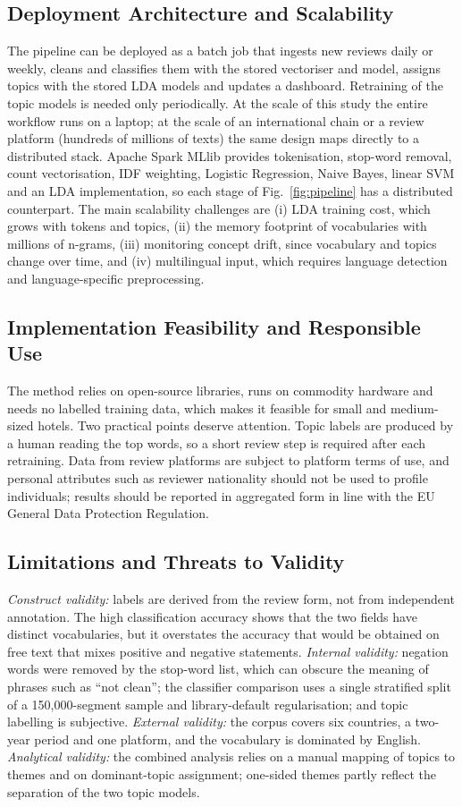 \documentclass[11pt,journal,draftclsnofoot,onecolumn]{IEEEtran}
\begin{document}
\subsection{Deployment Architecture and Scalability}
The pipeline can be deployed as a batch job that ingests new reviews daily or weekly, cleans and classifies them with the stored vectoriser and model, assigns topics with the stored LDA models and updates a dashboard. Retraining of the topic models is needed only periodically. At the scale of this study the entire workflow runs on a laptop; at the scale of an international chain or a review platform (hundreds of millions of texts) the same design maps directly to a distributed stack. Apache Spark MLlib \cite{meng2016} provides tokenisation, stop-word removal, count vectorisation, IDF weighting, Logistic Regression, Naive Bayes, linear SVM and an LDA implementation, so each stage of Fig.~\ref{fig:pipeline} has a distributed counterpart. The main scalability challenges are (i) LDA training cost, which grows with tokens and topics, (ii) the memory footprint of vocabularies with millions of n-grams, (iii) monitoring concept drift, since vocabulary and topics change over time, and (iv) multilingual input, which requires language detection and language-specific preprocessing.

\subsection{Implementation Feasibility and Responsible Use}
The method relies on open-source libraries, runs on commodity hardware and needs no labelled training data, which makes it feasible for small and medium-sized hotels. Two practical points deserve attention. Topic labels are produced by a human reading the top words, so a short review step is required after each retraining. Data from review platforms are subject to platform terms of use, and personal attributes such as reviewer nationality should not be used to profile individuals; results should be reported in aggregated form in line with the EU General Data Protection Regulation.

\subsection{Limitations and Threats to Validity}
\emph{Construct validity:} labels are derived from the review form, not from independent annotation. The high classification accuracy shows that the two fields have distinct vocabularies, but it overstates the accuracy that would be obtained on free text that mixes positive and negative statements. \emph{Internal validity:} negation words were removed by the stop-word list, which can obscure the meaning of phrases such as ``not clean''; the classifier comparison uses a single stratified split of a 150,000-segment sample and library-default regularisation; and topic labelling is subjective. \emph{External validity:} the corpus covers six countries, a two-year period and one platform, and the vocabulary is dominated by English. \emph{Analytical validity:} the combined analysis relies on a manual mapping of topics to themes and on dominant-topic assignment; one-sided themes partly reflect the separation of the two topic models.
\end{document}
